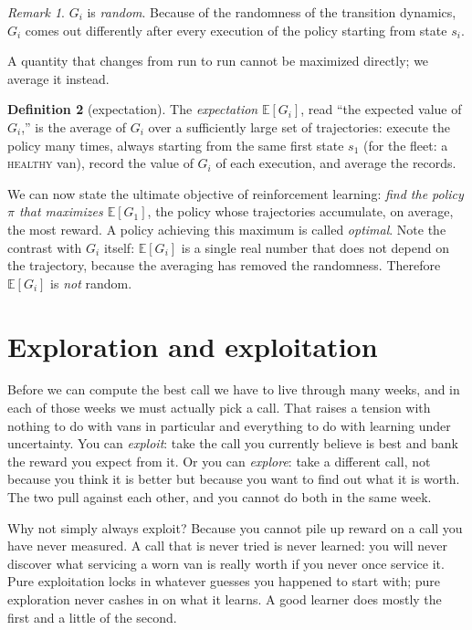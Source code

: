 \documentclass[11pt,a4paper]{article}
\theoremstyle{definition}
\newtheorem{definition}{Definition}[section]
\theoremstyle{remark}
\newtheorem{remark}[definition]{Remark}
\numberwithin{equation}{section}
\newcommand{\E}{\mathbb{E}}
\newcommand{\sa}[1]{\textsc{#1}}   %
\begin{document}
\begin{remark}
$G_i$ is \emph{random}. Because of the randomness of the transition dynamics, $G_i$ comes out
differently after every execution of the policy starting from state $s_i$.
\end{remark}

A quantity that changes from run to run cannot be maximized directly; we average it instead.

\begin{definition}[expectation]\label{def:expectation}
The \emph{expectation} $\E[G_i]$, read ``the expected value of $G_i$,'' is the average of
$G_i$ over a sufficiently large set of trajectories: execute the policy many times, always
starting from the same first state $s_1$ (for the fleet: a \sa{healthy} van), record the
value of $G_i$ of each execution, and average the records.
\end{definition}

We can now state the ultimate objective of reinforcement learning: \emph{find the policy
$\pi$ that maximizes $\E[G_1]$}, the policy whose trajectories accumulate, on average, the
most reward. A policy achieving this maximum is called \emph{optimal}. Note the contrast
with $G_i$ itself: $\E[G_i]$ is a single real number that does not depend on the
trajectory, because the averaging has removed the randomness. Therefore
$\E[G_i]$ is \emph{not} random.

\section{Exploration and exploitation}\label{sec:explore}

Before we can compute the best call we have to live through many weeks, and in each of those
weeks we must actually pick a call. That raises a tension with nothing to do with vans in
particular and everything to do with learning under uncertainty. You can \emph{exploit}: take
the call you currently believe is best and bank the reward you expect from it. Or you can
\emph{explore}: take a different call, not because you think it is better but because you want
to find out what it is worth. The two pull against each other, and you cannot do both in the
same week.

Why not simply always exploit? Because you cannot pile up reward on a call you have never
measured. A call that is never tried is never learned: you will never discover what servicing a
worn van is really worth if you never once service it. Pure exploitation locks in whatever
guesses you happened to start with; pure exploration never cashes in on what it learns. A good
learner does mostly the first and a little of the second.
\end{document}
